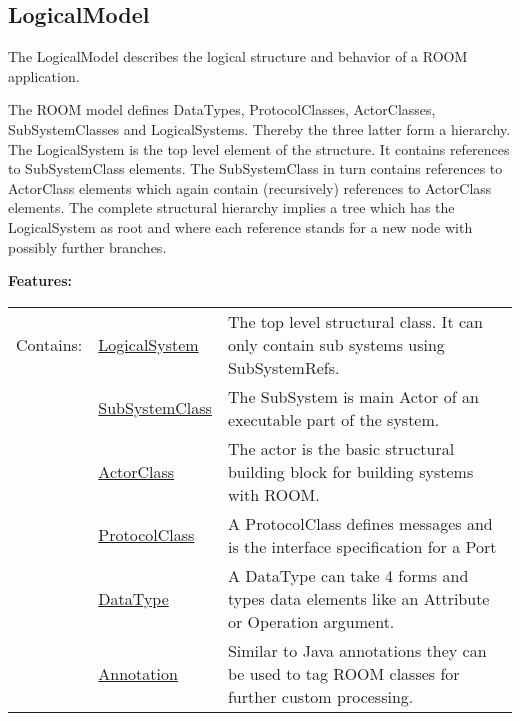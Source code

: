 		
		
		
		
	
	\vspace{\baselineskip}
	\vspace{\baselineskip}
	\vspace{\baselineskip}
	
\subsection{LogicalModel}
	\hypertarget{ref:LogicalModel}{}
	The LogicalModel describes the logical structure and behavior of a ROOM application.
		
	The ROOM model defines DataTypes, ProtocolClasses, ActorClasses, SubSystemClasses and LogicalSystems.
	Thereby the three latter form a hierarchy. The LogicalSystem is the top level element of the structure. 
	It contains references to SubSystemClass elements. The SubSystemClass in turn contains 
	references to ActorClass elements which again contain (recursively) references to 
	ActorClass elements. The complete structural hierarchy implies a tree which has the 
	LogicalSystem as root and where each reference stands for a new node with possibly further 
	branches.
		
		
	\begingroup
	\textbf{Features:}
	\renewcommand{\arraystretch}{1.8} %
	\begin{longtable}{l|l p{}}
		\hline
	Contains: & \tabitem \hyperlink{ref:LogicalSystem}{LogicalSystem}  & The top level structural class. It can only contain sub systems using SubSystemRefs.\\
	& \tabitem \hyperlink{ref:SubSystemClass}{SubSystemClass}  & The SubSystem is main Actor of an executable part of the system.  \\
	& \tabitem \hyperlink{ref:ActorClass}{ActorClass}  & The actor is the basic structural building block for building systems with ROOM. \\
	& \tabitem \hyperlink{ref:ProtocolClass}{ProtocolClass}  & A ProtocolClass defines messages and is the interface specification for a Port \\
	& \tabitem \hyperlink{ref:DataType}{DataType}  & A DataType can take 4 forms and types data elements like an Attribute or Operation argument. \\
	& \tabitem \hyperlink{ref:Annotation}{Annotation}  & Similar to Java annotations they can be used to tag ROOM classes for further custom processing. \\
	\hline
	\end{longtable}
	\endgroup
		
